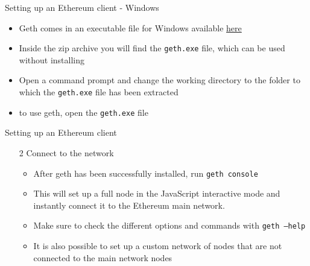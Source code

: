 \documentclass[9pt]{beamer}
\begin{document}

\begin{frame}{Setting up an Ethereum client - Windows}
	\begin{itemize}
		\item Geth comes in an executable file for Windows available \href{https://geth.ethereum.org/downloads/}{here}
		\item Inside the zip archive you will find the \texttt{geth.exe} file, which can be used without installing
		\item Open a command prompt and change the working directory to the folder to which the \texttt{geth.exe} file has been extracted
		\item to use geth, open the \texttt{geth.exe} file
	\end{itemize}
\end{frame}


\begin{frame}{Setting up an Ethereum client}
	\begin{enumerate}
		\item[2] Connect to the network
		\begin{itemize}
			\item After geth has been successfully installed, run \texttt{geth console}
			\item This will set up a full node in the JavaScript interactive mode and instantly connect it to the Ethereum main network.
			\item Make sure to check the different options and commands with \texttt{geth ---help}
			\item It is also possible to set up a custom network of nodes that are not connected to the main network nodes
		\end{itemize}
	\end{enumerate}
\end{frame}

\end{document}
